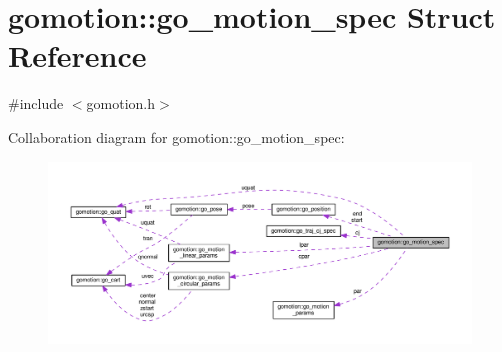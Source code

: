 \hypertarget{structgomotion_1_1go__motion__spec}{\section{gomotion\-:\-:go\-\_\-motion\-\_\-spec Struct Reference}
\label{structgomotion_1_1go__motion__spec}
}


{\ttfamily \#include $<$gomotion.\-h$>$}



Collaboration diagram for gomotion\-:\-:go\-\_\-motion\-\_\-spec\-:\nopagebreak
\begin{figure}[H]
\begin{center}
\leavevmode
\includegraphics[width=350pt]{d4/dbf/structgomotion_1_1go__motion__spec__coll__graph}
\end{center}
\end{figure}
